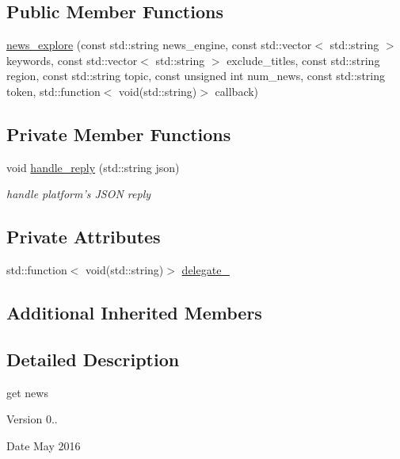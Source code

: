\subsection*{Public Member Functions}
\begin{DoxyCompactItemize}
\item 
\hyperlink{classrapp_1_1cloud_1_1news__explore_a9b3688370151e4a77185b0a1e26428c3}{news\-\_\-explore} (const std\-::string news\-\_\-engine, const std\-::vector$<$ std\-::string $>$ keywords, const std\-::vector$<$ std\-::string $>$ exclude\-\_\-titles, const std\-::string region, const std\-::string topic, const unsigned int num\-\_\-news, const std\-::string token, std\-::function$<$ void(std\-::string)$>$ callback)
\end{DoxyCompactItemize}
\subsection*{Private Member Functions}
\begin{DoxyCompactItemize}
\item 
void \hyperlink{classrapp_1_1cloud_1_1news__explore_a8351cc88df83279cf3bf83c9cf79d4e9}{handle\-\_\-reply} (std\-::string json)
\begin{DoxyCompactList}\small\item\em handle platform's J\-S\-O\-N reply \end{DoxyCompactList}\end{DoxyCompactItemize}
\subsection*{Private Attributes}
\begin{DoxyCompactItemize}
\item 
std\-::function$<$ void(std\-::string)$>$ \hyperlink{classrapp_1_1cloud_1_1news__explore_a12411f442b4d68dd0f7d53ea0eb4b119}{delegate\-\_\-}
\end{DoxyCompactItemize}
\subsection*{Additional Inherited Members}


\subsection{Detailed Description}
get news 

\begin{DoxyVersion}{Version}
0.. 
\end{DoxyVersion}
\begin{DoxyDate}{Date}
May 2016 
\end{DoxyDate}


